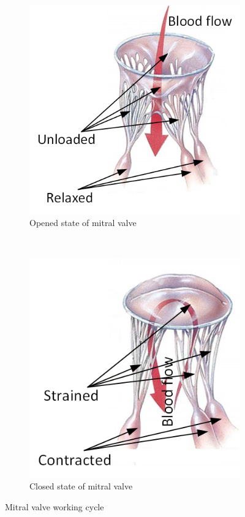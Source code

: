 \begin{figure}[H]
  \centering
  \begin{subfigure}[b]{0.4\textwidth}
    \includegraphics[width=\textwidth]{./fig/openMT.png}
      \caption{Opened state of mitral valve}
      \label{fig:normalMT}
  \end{subfigure}
  ~
  ~ %
  \begin{subfigure}[b]{0.4\textwidth}
    \includegraphics[width=\textwidth]{./fig/closedMT.png}
      \caption{Closed state of mitral valve}
      \label{fig:prolapseMT}
  \end{subfigure}
  \caption{Mitral valve working cycle}\label{fig:rodSystem}      
\end{figure} 


